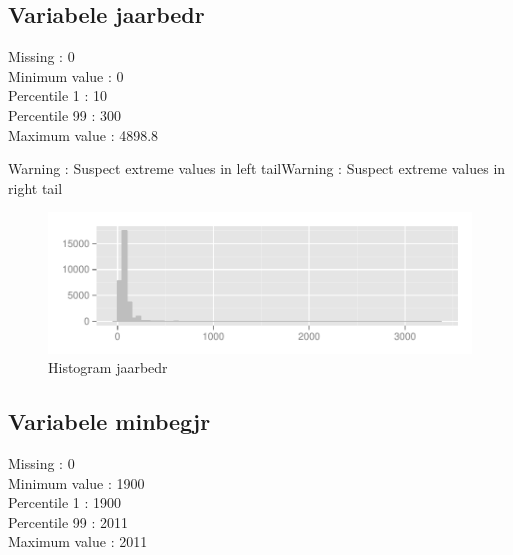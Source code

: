 \documentclass[10pt,a4paper,titlepage]{report}
\begin{document}
 




\subsection{Variabele jaarbedr}

Missing :  0 \\
Minimum value : 0\\
Percentile 1 : 10\\
Percentile 99 : 300\\
Maximum value : 4898.8

\color{red}
Warning : Suspect extreme values in left tailWarning : Suspect extreme values in right tail

\color{black}

\begin{figure}[H]
   \centering
\begin{knitrout}
\color{fgcolor}
\includegraphics[width=\maxwidth]{figure/unnamed-chunk-2} 

\end{knitrout}

    \caption{Histogram jaarbedr}
    \label{fig:figPlot1}
\end{figure}


\subsection{Variabele minbegjr}

Missing :  0 \\
Minimum value : 1900\\
Percentile 1 : 1900\\
Percentile 99 : 2011\\
Maximum value : 2011

\color{red}
\end{document}
